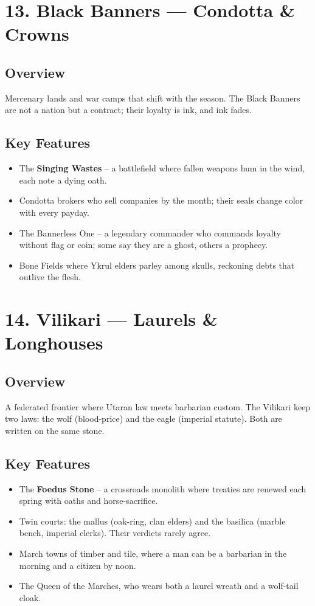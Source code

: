 \documentclass[11pt]{article}
\begin{document}
\section*{13. Black Banners --- Condotta \& Crowns}

\subsection*{Overview}
Mercenary lands and war camps that shift with the season. The Black Banners are not a nation but a contract; their loyalty is ink, and ink fades.

\subsection*{Key Features}
\begin{itemize}[leftmargin=*]
    \item The \textbf{Singing Wastes} -- a battlefield where fallen weapons hum in the wind, each note a dying oath.
    \item Condotta brokers who sell companies by the month; their seals change color with every payday.
    \item The Bannerless One -- a legendary commander who commands loyalty without flag or coin; some say they are a ghost, others a prophecy.
    \item Bone Fields where Ykrul elders parley among skulls, reckoning debts that outlive the flesh.
\end{itemize}

\section*{14. Vilikari --- Laurels \& Longhouses}

\subsection*{Overview}
A federated frontier where Utaran law meets barbarian custom. The Vilikari keep two laws: the wolf (blood-price) and the eagle (imperial statute). Both are written on the same stone.

\subsection*{Key Features}
\begin{itemize}[leftmargin=*]
    \item The \textbf{Foedus Stone} -- a crossroads monolith where treaties are renewed each spring with oaths and horse-sacrifice.
    \item Twin courts: the mallus (oak-ring, clan elders) and the basilica (marble bench, imperial clerks). Their verdicts rarely agree.
    \item March towns of timber and tile, where a man can be a barbarian in the morning and a citizen by noon.
    \item The Queen of the Marches, who wears both a laurel wreath and a wolf-tail cloak.
\end{itemize}
\end{document}
